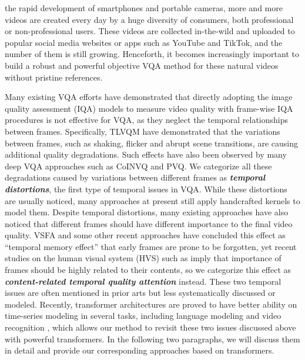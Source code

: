 \documentclass[journal]{IEEEtran}
\begin{document}
 the rapid development of smartphones and portable cameras, more and more videos are created every day by a huge diversity of consumers, both professional or non-professional users.
These videos are collected in-the-wild and uploaded to popular social media websites or apps such as YouTube and TikTok, and the number of them is still growing. Henceforth, it becomes increasingly important to build a robust and powerful objective VQA method for these natural videos without pristine references.








Many existing VQA efforts \cite{vsfa,tlvqm,vbliinds,videval,rfugc,pvq} have demonstrated that directly adopting the image quality assessment (IQA) models to measure video quality with frame-wise IQA procedures is not effective for VQA, as they neglect the temporal relationships between frames. Specifically, TLVQM\cite{tlvqm} have demonstrated that the variations between frames, such as shaking, flicker and abrupt scene transitions, are causing additional quality degradations. Such effects have also been observed by many deep VQA approaches such as CoINVQ\cite{rfugc} and PVQ\cite{pvq}. We categorize all these degradations caused by variations between different frames as \textit{\textbf{temporal distortions}}, the first type of temporal issues in VQA. While these distortions are usually noticed, many approaches at present still apply handcrafted kernels to model them. Despite temporal distortions, many existing approaches have also noticed that different frames should have different importance to the final video quality. VSFA\cite{vsfa} and some other recent approaches \cite{mdtvsfa, bvqa2022} have concluded this effect as ``temporal memory effect'' that early frames are prone to be forgotten, yet recent studies on the human visual system (HVS) such as \cite{febrain} imply that importance of frames should be highly related to their contents, so we categorize this effect as \textit{\textbf{content-related temporal quality attention}} instead. These two temporal issues are often mentioned in prior arts but less systematically discussed or modeled. Recently, transformer architectures 
are proved to have better ability on time-series modeling in several tasks, including language modeling \cite{allyouneed} and video recognition \cite{vivit,mvit,swin3d}, which allows our method to revisit these two issues discussed above with powerful transformers. In the following two paragraphs, we will discuss them in detail and provide our corresponding approaches based on transformers.
\end{document}
